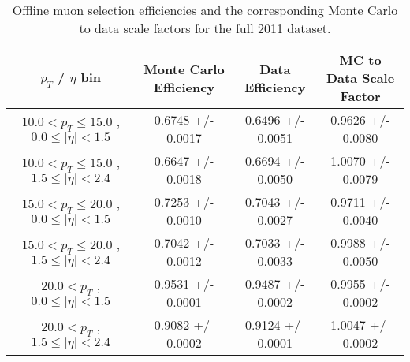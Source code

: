  \begin{table}[!ht]
 \begin{center} 
 \begin{tabular}{|c|c|c|c|}
 \hline
 $p_{T}$ / $\eta$ bin    &  Monte Carlo Efficiency    &  Data Efficiency   &  MC to Data Scale Factor \\   \hline           
$ 10.0 < p_{T} \le  15.0$ , $  0.0  \le |\eta| <   1.5$   &       0.6748 +/- 0.0017   &       0.6496 +/- 0.0051   &       0.9626 +/- 0.0080   \\   
\hline
$ 10.0 < p_{T} \le  15.0$ , $  1.5  \le |\eta| <   2.4$   &       0.6647 +/- 0.0018   &       0.6694 +/- 0.0050   &       1.0070 +/- 0.0079   \\   
\hline
$ 15.0 < p_{T} \le  20.0$ , $  0.0  \le |\eta| <   1.5$   &       0.7253 +/- 0.0010   &       0.7043 +/- 0.0027   &       0.9711 +/- 0.0040   \\   
\hline
$ 15.0 < p_{T} \le  20.0$ , $  1.5  \le |\eta| <   2.4$   &       0.7042 +/- 0.0012   &       0.7033 +/- 0.0033   &       0.9988 +/- 0.0050   \\   
\hline
$ 20.0 < p_{T} $ , $  0.0  \le |\eta| <   1.5$   &       0.9531 +/- 0.0001   &       0.9487 +/- 0.0002   &       0.9955 +/- 0.0002   \\   
\hline
$ 20.0 < p_{T} $ , $  1.5  \le |\eta| <   2.4$   &       0.9082 +/- 0.0002   &       0.9124 +/- 0.0001   &       1.0047 +/- 0.0002   \\   
\hline
\end{tabular}
\caption{Offline muon selection efficiencies and the corresponding Monte Carlo to data scale factors for the
full 2011 dataset.}
\label{tab:eff_mu_offline_Full2011}
\end{center}
\end{table}
